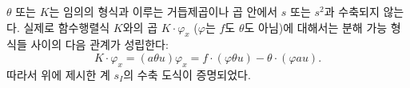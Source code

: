 
$\theta$ 또는 $K$는 임의의 형식과 이루는 거듭제곱이나 곱 안에서 $s$ 또는 $s^2$과 수축되지 않는다. 실제로 함수행렬식 $K$와의 곱 $K\cdot\varphi_x$ ($\varphi$는 $f$도 $\theta$도 아님)에 대해서는 분해 가능 형식들 사이의 다음 관계가 성립한다:
\[
K\cdot\varphi_x=(a\theta u)\varphi_x=f\cdot(\varphi\theta u)-\theta\cdot(\varphi a u).
\]
따라서 위에 제시한 계 $s_I$의 수축 도식이 증명되었다.
